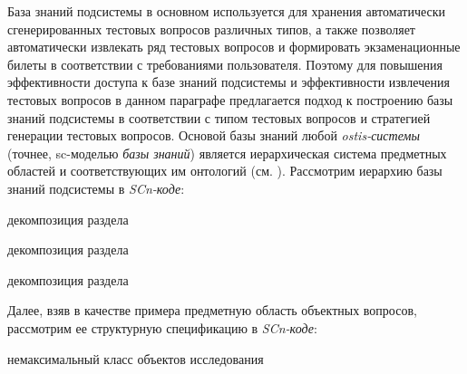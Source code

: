 База знаний подсистемы в основном используется для хранения автоматически сгенерированных тестовых вопросов различных типов, а также позволяет автоматически извлекать ряд тестовых вопросов и формировать экзаменационные билеты в соответствии с требованиями пользователя. Поэтому для повышения эффективности доступа к базе знаний подсистемы и эффективности извлечения тестовых вопросов в данном параграфе предлагается подход к построению базы знаний подсистемы в соответствии с типом тестовых вопросов и стратегией генерации тестовых вопросов. Основой базы знаний любой \textit{ostis-системы} (точнее, sc-моделью \textit{базы знаний}) является иерархическая система предметных областей и соответствующих им онтологий (см. ). Рассмотрим иерархию базы знаний подсистемы в \textit{SCn-коде}:
\begin{SCn}
	
	\begin{scnrelfromset}{декомпозиция раздела}
		
		
		\begin{scnrelfromset}{декомпозиция раздела}
		\end{scnrelfromset}
		
		
		\begin{scnrelfromset}{декомпозиция раздела}
		\end{scnrelfromset}
		
	\end{scnrelfromset}
\end{SCn}

Далее, взяв в качестве примера предметную область объектных вопросов, рассмотрим ее структурную спецификацию в \textit{SCn-коде}:
\begin{SCn}
	\begin{scnhaselementrolelist}{немаксимальный класс объектов исследования}
	\end{scnhaselementrolelist}
\end{SCn}


